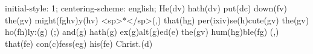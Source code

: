 initial-style: 1;
centering-scheme: english;
He(dv) hath(dv) put(dc) down(fv) the(gv) might(fghv)y(hv) <sp>*</sp>(,) that(hg) per(ixiv)se(h)cute(gv) the(gv) ho(fh)ly:(g) (;) and(g) hath(g) ex(g)alt(g)ed(e) the(gv) hum(hg)ble(fg) (,) that(fe) con(c)fess(eg) his(fe) Christ.(d)